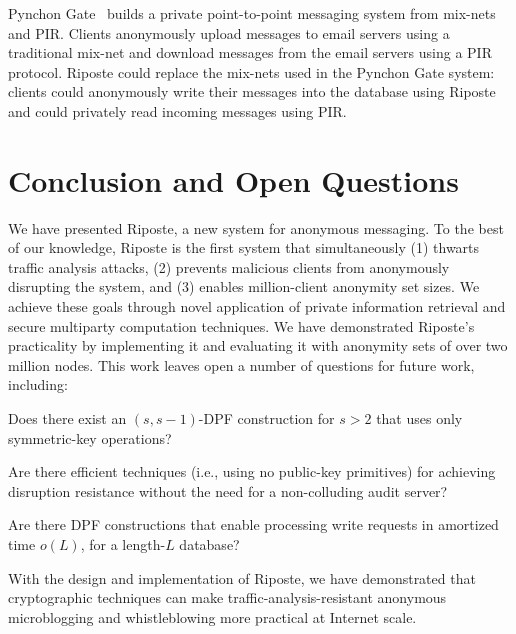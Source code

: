 \documentclass[10pt,twocolumn]{article}
\newcommand{\name}{Riposte\xspace}
\newcommand{\Name}{Riposte\xspace}
\begin{document}
Pynchon Gate~\cite{sassaman2005pynchon} builds a 
private point-to-point messaging system from mix-nets and PIR.
Clients anonymously upload messages to email servers using a traditional mix-net
and download messages from the email servers using a PIR protocol.
\Name could replace the mix-nets used in the Pynchon Gate system: clients
could anonymously write their messages into the database using \name
and could privately read incoming messages using PIR.

 \section{Conclusion and Open Questions}
\label{sec:concl}

We have presented \name, a new system for anonymous messaging.
To the best of our knowledge, \name is the first system
that simultaneously 
(1) thwarts traffic analysis attacks,
(2) prevents malicious clients from anonymously disrupting the system, and
(3) enables million-client anonymity set sizes.
We achieve these goals through novel application of private information
retrieval and secure multiparty computation techniques.
We have demonstrated \name's practicality by implementing it and
evaluating it with anonymity sets of over two million nodes.
This work leaves open a number of questions for future work, including:
\begin{compactitem}
\item Does there exist an $(s,s-1)$-DPF construction for $s > 2$
      that uses only symmetric-key operations?
\item Are there efficient techniques 
      (i.e., using no public-key primitives) for achieving
      disruption resistance without the need for a
      non-colluding audit server?
\item Are there DPF constructions that enable processing
      write requests in amortized time $o(L)$, for a 
      length-$L$ database?
\end{compactitem}
With the design and implementation of \name,
we have demonstrated that cryptographic techniques can 
make traffic-analysis-resistant anonymous microblogging
and whistleblowing more practical at Internet scale.
\end{document}

